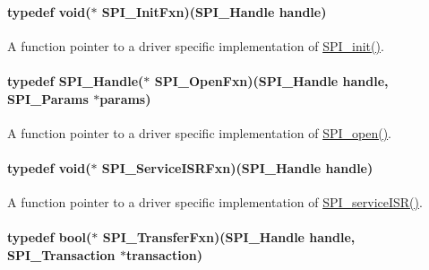 \paragraph[{S\-P\-I\-\_\-\-Init\-Fxn}]{\setlength{\rightskip}{0pt plus 5cm}typedef void($\ast$ S\-P\-I\-\_\-\-Init\-Fxn)({\bf S\-P\-I\-\_\-\-Handle} handle)}\label{_s_p_i_8h_ab316f5bfe00febe920ebe27021f47916}


A function pointer to a driver specific implementation of \hyperlink{_s_p_i_8h_afd9b09f58917f0e2d14c61b956eba214}{S\-P\-I\-\_\-init()}. 

\paragraph[{S\-P\-I\-\_\-\-Open\-Fxn}]{\setlength{\rightskip}{0pt plus 5cm}typedef {\bf S\-P\-I\-\_\-\-Handle}($\ast$ S\-P\-I\-\_\-\-Open\-Fxn)({\bf S\-P\-I\-\_\-\-Handle} handle, {\bf S\-P\-I\-\_\-\-Params} $\ast$params)}\label{_s_p_i_8h_a4968bfeca9b1f3713355a78e88679570}


A function pointer to a driver specific implementation of \hyperlink{_s_p_i_8h_a62cfe494cb1df47cd602e8747e894fd1}{S\-P\-I\-\_\-open()}. 

\paragraph[{S\-P\-I\-\_\-\-Service\-I\-S\-R\-Fxn}]{\setlength{\rightskip}{0pt plus 5cm}typedef void($\ast$ S\-P\-I\-\_\-\-Service\-I\-S\-R\-Fxn)({\bf S\-P\-I\-\_\-\-Handle} handle)}\label{_s_p_i_8h_a382ab11d58280f1c1de4d0dbc632e3c3}


A function pointer to a driver specific implementation of \hyperlink{_s_p_i_8h_aa6f1baa732ebbf0aa7cd5c3f7dfd215a}{S\-P\-I\-\_\-service\-I\-S\-R()}. 

\paragraph[{S\-P\-I\-\_\-\-Transfer\-Fxn}]{\setlength{\rightskip}{0pt plus 5cm}typedef bool($\ast$ S\-P\-I\-\_\-\-Transfer\-Fxn)({\bf S\-P\-I\-\_\-\-Handle} handle, {\bf S\-P\-I\-\_\-\-Transaction} $\ast$transaction)}\label{_s_p_i_8h_a0c46374ffaa3d81ded9c8da17e16b861}


